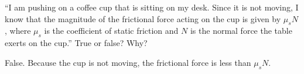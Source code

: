 “I am pushing on a coffee cup that is sitting on my desk. Since it is not moving, I know that the magnitude of the frictional force acting on the cup is given by $\mu_sN$, where $\mu_s$ is the coefficient of static friction and $N$ is the normal force the table exerts on the cup.” True or false? Why?

\begin{solution}
    False. Because the cup is not moving, the frictional force is less than $\mu_sN$.
\end{solution}